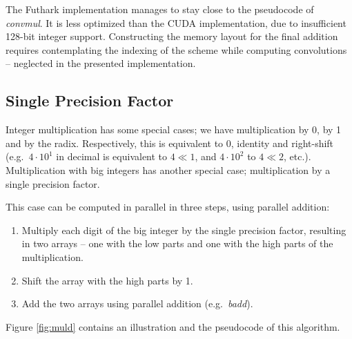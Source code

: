 The Futhark implementation manages to stay close to the pseudocode of
\textit{convmul}. It is less optimized than the CUDA implementation, due to
insufficient 128-bit integer support. Constructing the memory layout for the
final addition requires contemplating the indexing of the scheme while computing
convolutions -- neglected in the presented implementation.

\subsection{Single Precision Factor}
\label{subsec:mulsin}

Integer multiplication has some special cases; we have multiplication by 0, by 1
and by the radix. Respectively, this is equivalent to 0, identity and
right-shift (e.g.\ $4 \cdot 10^1$ in decimal is equivalent to $4 \ll 1$, and
$4\cdot 10^2$ to $4\ll 2$, etc.). Multiplication with big integers has another special
case; multiplication by a single precision factor.

This case can be computed in parallel in three steps, using parallel addition:
\begin{enumerate}[label=\Roman*]
\item Multiply each digit of the big integer by the single precision factor,
  resulting in two arrays -- one with the low parts and one with the high parts
  of the multiplication.
\item Shift the array with the high parts by 1.
\item Add the two arrays using parallel addition (e.g.\ \textit{badd}).
\end{enumerate}
Figure \ref{fig:muld} contains an illustration and the pseudocode of this
algorithm.

